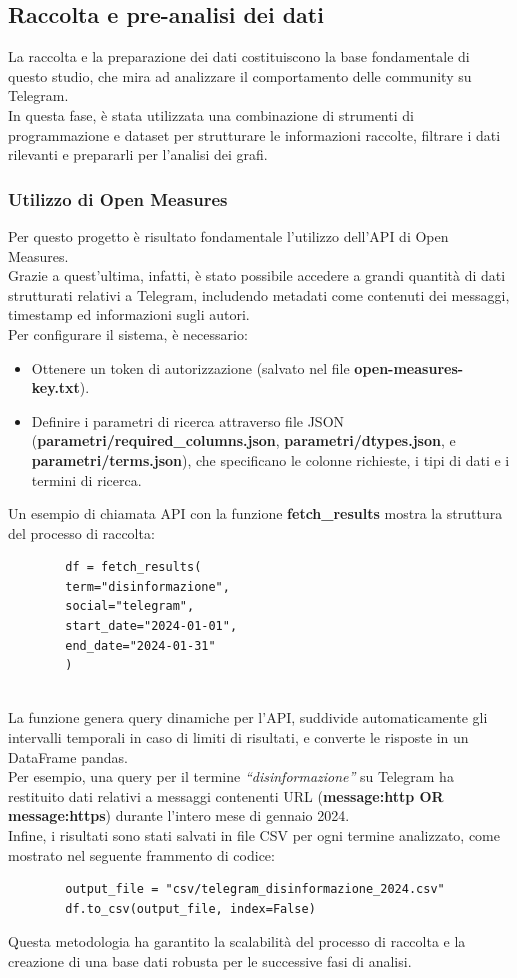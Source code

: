 \documentclass[12pt]{article}
\begin{document}
	\subsection{Raccolta e pre-analisi dei dati}
	La raccolta e la preparazione dei dati costituiscono la base fondamentale di questo studio, che mira ad analizzare il comportamento delle community su Telegram.\\
	In questa fase, è stata utilizzata una combinazione di strumenti di programmazione e dataset per strutturare le informazioni raccolte, filtrare i dati rilevanti e prepararli per l'analisi dei grafi.
	\subsubsection{Utilizzo di Open Measures}
	Per questo progetto è risultato fondamentale l'utilizzo dell'API di Open Measures.\\
	Grazie a quest'ultima, infatti, è stato possibile accedere a grandi quantità di dati strutturati relativi a Telegram, includendo metadati come contenuti dei messaggi, timestamp ed informazioni sugli autori.\\
	Per configurare il sistema, è necessario:
	\begin{itemize}[label=] 
		\item Ottenere un token di autorizzazione (salvato nel file \textbf{open-measures-key.txt}).
		\item Definire i parametri di ricerca attraverso file JSON (\textbf{parametri/required\_columns.json}, \textbf{parametri/dtypes.json}, e \textbf{parametri/terms.json}), che specificano le colonne richieste, i tipi di dati e i termini di ricerca.
	\end{itemize}
	Un esempio di chiamata API con la funzione \textbf{fetch\_results} mostra la struttura del processo di raccolta:
	\begin{lstlisting}
		df = fetch_results(
		term="disinformazione",
		social="telegram",
		start_date="2024-01-01",
		end_date="2024-01-31"
		)
		
	\end{lstlisting}
	La funzione genera query dinamiche per l’API, suddivide automaticamente gli intervalli temporali in caso di limiti di risultati, e converte le risposte in un DataFrame pandas.\\
	Per esempio, una query per il termine \textit{“disinformazione”} su Telegram ha restituito dati relativi a messaggi contenenti URL (\textbf{message:http OR message:https}) durante l'intero mese di gennaio 2024.
	\\
	Infine, i risultati sono stati salvati in file CSV per ogni termine analizzato, come mostrato nel seguente frammento di codice:
	\begin{lstlisting}
		output_file = "csv/telegram_disinformazione_2024.csv"
		df.to_csv(output_file, index=False)
	\end{lstlisting}
	Questa metodologia ha garantito la scalabilità del processo di raccolta e la creazione di una base dati robusta per le successive fasi di analisi.
\end{document}
